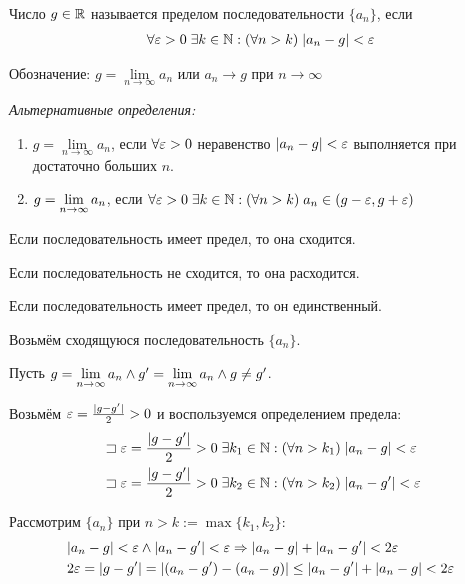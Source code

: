 \documentclass{article}
\begin{document}


Число $g \in\mathbb{R}$ называется пределом последовательности $\{a_n\}$, если
\begin{align*}
	\forall\varepsilon>0\;\exists k\in\mathbb{N}:(\forall n>k)\;|a_{n}-g|<\varepsilon
\end{align*}

Обозначение: $g=\lim\limits_{n\to\infty}{a_n}$ или $a_n \rightarrow {g}$ при $n \rightarrow {\infty}$

{\it Альтернативные определения:}

\begin{enumerate}
	\item{}$g=\lim\limits_{n\to\infty}{a_n}$, если $\forall\varepsilon>0$ неравенство $|a_n-g|<\varepsilon$ выполняется при достаточно больших $n$.
	\item{}$g=\lim\limits_{n\to\infty} a_{n}$, если $\forall\varepsilon>0\;\exists k\in\mathbb{N}:(\forall n>k)\;a_{n}\in(g-\varepsilon,g+\varepsilon)$
\end{enumerate}


Если последовательность имеет предел, то она сходится.

Если последовательность не сходится, то она расходится.

\theorem

Если последовательность имеет предел, то он единственный.

\proof

Возьмём сходящуюся последовательность $\{a_{n}\}$.

Пусть $g=\lim\limits_{n\to\infty} a_{n}\land g'=\lim\limits_{n\to\infty} a_{n}\land g\neq g'$.

Возьмём $\varepsilon=\frac{|g-g'|}{2}>0$ и воспользуемся определением предела:
\begin{align*}
	 & \sqsupset \varepsilon=\frac{|g-g'|}{2}>0\;\exists k_1\in\mathbb{N}:(\forall n>k_1)\;|a_{n}-g|<\varepsilon  \\
	 & \sqsupset \varepsilon=\frac{|g-g'|}{2}>0\;\exists k_2\in\mathbb{N}:(\forall n>k_2)\;|a_{n}-g'|<\varepsilon
\end{align*}

Рассмотрим $\{a_{n}\}$ при $n>k:=\max\{k_1,k_2\}$:
\begin{align*}
	 & |a_{n}-g|<\varepsilon\land|a_{n}-g'|<\varepsilon\Rightarrow|a_{n}-g|+|a_{n}-g'|<2\varepsilon \\
	 & 2\varepsilon=|g-g'|=|(a_{n}-g')-(a_{n}-g)|\leq|a_{n}-g'|+|a_{n}-g|<2\varepsilon
\end{align*}
\end{document}
